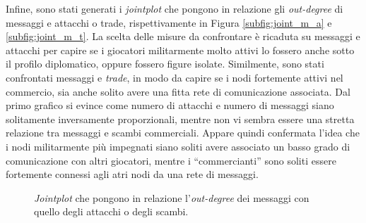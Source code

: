Infine, sono stati generati i \textit{jointplot} che pongono in relazione gli \textit{out-degree} di messaggi e attacchi o trade, rispettivamente in Figura \ref{subfig:joint_m_a} e \ref{subfig:joint_m_t}. La scelta delle misure da confrontare è ricaduta su messaggi e attacchi per capire se i giocatori militarmente molto attivi lo fossero anche sotto il profilo diplomatico, oppure fossero figure isolate. Similmente, sono stati confrontati messaggi e \textit{trade}, in modo da capire se i nodi fortemente attivi nel commercio, sia anche solito avere una fitta rete di comunicazione associata. Dal primo grafico si evince come numero di attacchi e numero di messaggi siano solitamente inversamente proporzionali, mentre non vi sembra essere una stretta relazione tra messaggi e scambi commerciali. Appare quindi confermata l'idea che i nodi militarmente più impegnati siano soliti avere associato un basso grado di comunicazione con altri giocatori, mentre i “commercianti” sono soliti essere fortemente connessi agli atri nodi da una rete di messaggi.
\begin{figure}
	\hfill
	\caption{\textit{Jointplot} che pongono in relazione l'\textit{out-degree} dei messaggi con quello degli attacchi o degli scambi.}
	\label{fig:join_mixed}
\end{figure}

